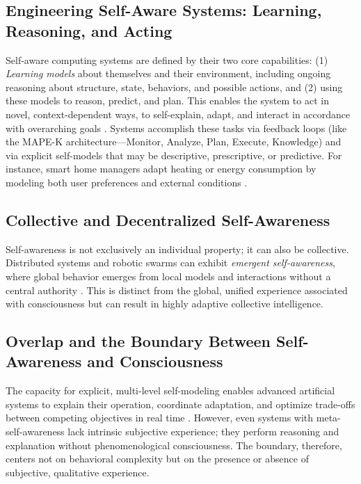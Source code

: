\subsection{Engineering Self-Aware Systems: Learning, Reasoning, and Acting}

Self-aware computing systems are defined by their two core capabilities: (1) \emph{Learning models} about themselves and their environment, including ongoing reasoning about structure, state, behaviors, and possible actions, and (2) using these models to reason, predict, and plan. This enables the system to act in novel, context-dependent ways, to self-explain, adapt, and interact in accordance with overarching goals \cite{kounev2017notion}. Systems accomplish these tasks via feedback loops (like the MAPE-K architecture---Monitor, Analyze, Plan, Execute, Knowledge) and via explicit self-models that may be descriptive, prescriptive, or predictive. For instance, smart home managers adapt heating or energy consumption by modeling both user preferences and external conditions \cite{giese2017engineering}.

\subsection{Collective and Decentralized Self-Awareness}

Self-awareness is not exclusively an individual property; it can also be collective. Distributed systems and robotic swarms can exhibit \emph{emergent self-awareness}, where global behavior emerges from local models and interactions without a central authority \cite{lewis2015architectural,mitchell2005self}. This is distinct from the global, unified experience associated with consciousness but can result in highly adaptive collective intelligence.

\subsection{Overlap and the Boundary Between Self-Awareness and Consciousness}

The capacity for explicit, multi-level self-modeling enables advanced artificial systems to explain their operation, coordinate adaptation, and optimize trade-offs between competing objectives in real time \cite{kounev2017notion,lewis2016self}. However, even systems with meta-self-awareness lack intrinsic subjective experience; they perform reasoning and explanation without phenomenological consciousness. The boundary, therefore, centers not on behavioral complexity but on the presence or absence of subjective, qualitative experience.

